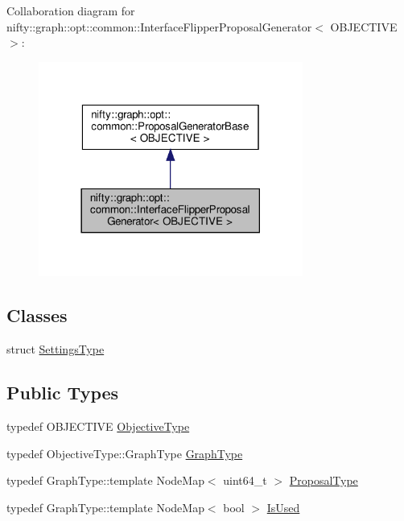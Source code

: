 Collaboration diagram for nifty\+:\+:graph\+:\+:opt\+:\+:common\+:\+:Interface\+Flipper\+Proposal\+Generator$<$ O\+B\+J\+E\+C\+T\+I\+VE $>$\+:
\nopagebreak
\begin{figure}[H]
\begin{center}
\leavevmode
\includegraphics[width=246pt]{classnifty_1_1graph_1_1opt_1_1common_1_1InterfaceFlipperProposalGenerator__coll__graph}
\end{center}
\end{figure}
\subsection*{Classes}
\begin{DoxyCompactItemize}
\item 
struct \hyperlink{structnifty_1_1graph_1_1opt_1_1common_1_1InterfaceFlipperProposalGenerator_1_1SettingsType}{Settings\+Type}
\end{DoxyCompactItemize}
\subsection*{Public Types}
\begin{DoxyCompactItemize}
\item 
typedef O\+B\+J\+E\+C\+T\+I\+VE \hyperlink{classnifty_1_1graph_1_1opt_1_1common_1_1InterfaceFlipperProposalGenerator_a9dcf430ac057ae5144895c5bdf547086}{Objective\+Type}
\item 
typedef Objective\+Type\+::\+Graph\+Type \hyperlink{classnifty_1_1graph_1_1opt_1_1common_1_1InterfaceFlipperProposalGenerator_ab4ea7c93e1f428ccbc18970150cac7b8}{Graph\+Type}
\item 
typedef Graph\+Type\+::template Node\+Map$<$ uint64\+\_\+t $>$ \hyperlink{classnifty_1_1graph_1_1opt_1_1common_1_1InterfaceFlipperProposalGenerator_aced6351cf8e65e436e1efedd8f5ed089}{Proposal\+Type}
\item 
typedef Graph\+Type\+::template Node\+Map$<$ bool $>$ \hyperlink{classnifty_1_1graph_1_1opt_1_1common_1_1InterfaceFlipperProposalGenerator_aa1d36e33904e90a5fb6460cf883bf871}{Is\+Used}
\end{DoxyCompactItemize}
